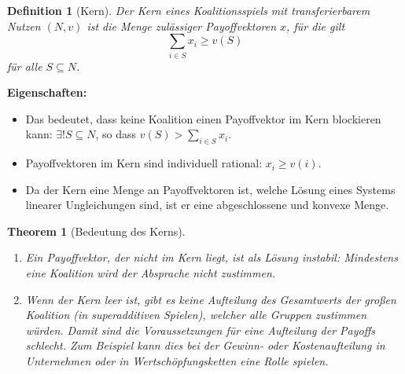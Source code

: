 \documentclass[12pt]{extreport} %
\theoremstyle{named}
\newtheorem{unnamedtheorem}{Theorem} \counterwithin{unnamedtheorem}{chapter}
\theoremstyle{itshape}
\newtheorem*{definition}{Definition}
\theoremstyle{normal}
\begin{document}
\begin{definition}[Kern]
	Der Kern eines Koalitionsspiels mit transferierbarem Nutzen $(N, v)$ ist die Menge zulässiger Payoffvektoren $x$, für die gilt
	$$ \sum_{i \in S} x_i \geq v(S) $$
	für alle $S \subseteq N$.
\end{definition}

\textbf{Eigenschaften:}
\begin{itemize}
	\item Das bedeutet, dass keine Koalition einen Payoffvektor im Kern blockieren kann: $\exists! S \subseteq N$, so dass $v(S) > \sum_{i \in S} x_i$.
	\item Payoffvektoren im Kern sind individuell rational: $x_i \geq v(i)$.
	\item Da der Kern eine Menge an Payoffvektoren ist, welche Lösung eines Systems linearer Ungleichungen sind, ist er eine abgeschlossene und konvexe Menge.
\end{itemize}

\begin{unnamedtheorem}[Bedeutung des Kerns] ~\
	\begin{enumerate}
		\item Ein Payoffvektor, der nicht im Kern liegt, ist als Lösung instabil: Mindestens eine Koalition wird der Absprache nicht zustimmen.
		\item Wenn der Kern leer ist, gibt es keine Aufteilung des Gesamtwerts der großen Koalition (in superadditiven Spielen), welcher alle Gruppen zustimmen würden. Damit sind die Voraussetzungen für eine Aufteilung der Payoffs schlecht. Zum Beispiel kann dies bei der Gewinn- oder Kostenaufteilung in Unternehmen oder in Wertschöpfungsketten eine Rolle spielen.
	\end{enumerate} 
\end{unnamedtheorem}
 
\end{document}
